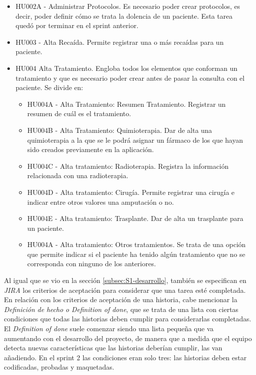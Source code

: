 \begin{itemize}
\item HU002A - Administrar Protocolos. Es necesario poder crear protocolos, es decir, poder definir cómo se trata la dolencia de un paciente. Esta tarea quedó por terminar en el sprint anterior.
\item HU003 - Alta Recaída. Permite registrar una o más recaídas para un paciente.
\item HU004 Alta Tratamiento. Engloba todos los elementos que conforman un tratamiento y que es necesario poder crear antes de pasar la consulta con el paciente. Se divide en:
	\begin{itemize}
	\item HU004A - Alta Tratamiento: Resumen Tratamiento. Registrar un resumen de cuál es el tratamiento.
	\item HU004B - Alta Tratamiento: Quimioterapia. Dar de alta una quimioterapia a la que se le podrá asignar un fármaco de los que hayan sido creados previamente en la aplicación.
	\item HU004C - Alta tratamiento: Radioterapia. Registra la información relacionada con una radioterapia.
	\item HU004D - Alta tratamiento: Cirugía. Permite registrar una cirugía e indicar entre otros valores una amputación o no.
	\item HU004E - Alta tratamiento: Trasplante. Dar de alta un trasplante para un paciente.
	\item HU004A - Alta tratamiento: Otros tratamientos. Se trata de una opción que permite indicar si el paciente ha tenido algún tratamiento que no se corresponda con ninguno de los anteriores.
	\end{itemize}
\end{itemize}

Al igual que se vio en la sección \ref{subsec:S1-desarrollo}, también se especifican en \emph{JIRA} los criterios de aceptación para considerar que una tarea esté completada. En relación con los criterios de aceptación de una historia, cabe mencionar la \emph{Definición de hecho o Definition of done}, que se trata de una lista con ciertas condiciones que todas las historias deben cumplir para considerarlas completadas. El \emph{Definition of done} suele comenzar siendo una lista pequeña que va aumentando con el desarrollo del proyecto, de manera que a medida que el equipo detecta nuevas características que las historias deberían cumplir, las van añadiendo. En el sprint 2 las condiciones eran solo tres: las historias deben estar codificadas, probadas y maquetadas. 

